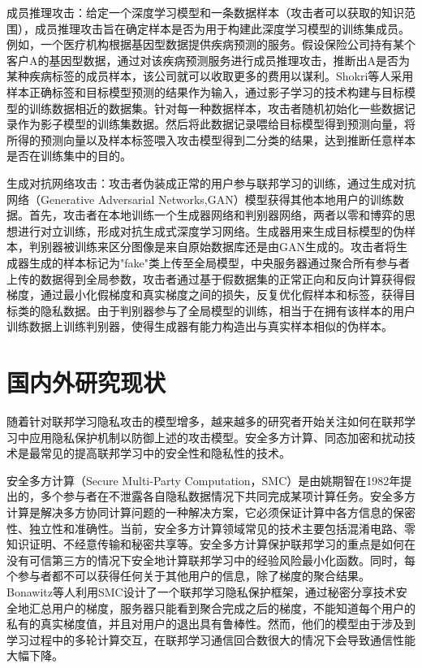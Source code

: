 成员推理攻击：给定一个深度学习模型和一条数据样本（攻击者可以获取的知识范围），成员推理攻击旨在确定样本是否为用于构建此深度学习模型的训练集成员。例如，一个医疗机构根据基因型数据提供疾病预测的服务。假设保险公司持有某个客户A的基因型数据，通过对该疾病预测服务进行成员推理攻击，推断出A是否为某种疾病标签的成员样本，该公司就可以收取更多的费用以谋利。Shokri等人采用样本正确标签和目标模型预测的结果作为输入，通过影子学习的技术构建与目标模型的训练数据相近的数据集。针对每一种数据样本，攻击者随机初始化一些数据记录作为影子模型的训练集数据。然后将此数据记录喂给目标模型得到预测向量，将所得的预测向量以及样本标签喂入攻击模型得到二分类的结果，达到推断任意样本是否在训练集中的目的。

生成对抗网络攻击：攻击者伪装成正常的用户参与联邦学习的训练，通过生成对抗网络（Generative Adversarial Networks,GAN）模型获得其他本地用户的训练数据。首先，攻击者在本地训练一个生成器网络和判别器网络，两者以零和博弈的思想进行对立训练，形成对抗生成式深度学习网络。生成器用来生成目标模型的伪样本，判别器被训练来区分图像是来自原始数据库还是由GAN生成的。攻击者将生成器生成的样本标记为"fake"类上传至全局模型，中央服务器通过聚合所有参与者上传的数据得到全局参数，攻击者通过基于假数据集的正常正向和反向计算获得假梯度，通过最小化假梯度和真实梯度之间的损失，反复优化假样本和标签，获得目标类的隐私数据。由于判别器参与了全局模型的训练，相当于在拥有该样本的用户训练数据上训练判别器，使得生成器有能力构造出与真实样本相似的伪样本。

\section{国内外研究现状}
随着针对联邦学习隐私攻击的模型增多，越来越多的研究者开始关注如何在联邦学习中应用隐私保护机制以防御上述的攻击模型。安全多方计算、同态加密和扰动技术是最常见的提高联邦学习中的安全性和隐私性的技术。

安全多方计算（Secure Multi-Party Computation，SMC）是由姚期智在1982年提出的，多个参与者在不泄露各自隐私数据情况下共同完成某项计算任务。安全多方计算是解决多方协同计算问题的一种解决方案，它必须保证计算中各方信息的保密性、独立性和准确性。当前，安全多方计算领域常见的技术主要包括混淆电路、零知识证明、不经意传输和秘密共享等。安全多方计算保护联邦学习的重点是如何在没有可信第三方的情况下安全地计算联邦学习中的经验风险最小化函数。同时，每个参与者都不可以获得任何关于其他用户的信息，除了梯度的聚合结果。Bonawitz等人利用SMC设计了一个联邦学习隐私保护框架，通过秘密分享技术安全地汇总用户的梯度，服务器只能看到聚合完成之后的梯度，不能知道每个用户的私有的真实梯度值，并且对用户的退出具有鲁棒性。然而，他们的模型由于涉及到学习过程中的多轮计算交互，在联邦学习通信回合数很大的情况下会导致通信性能大幅下降。

